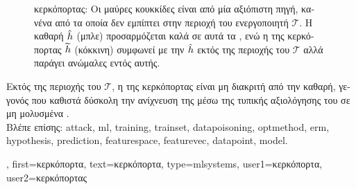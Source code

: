 {{\begin{figure}[H]
\begin{center}
 			\end{center}
		{
 		\caption{ \foreignlanguage{greek}{κερκόπορτας}: \foreignlanguage{greek}{Οι μαύρες κουκκίδες είναι} 
			 \foreignlanguage{greek}{από μία αξιόπιστη πηγή, κανένα από τα οποία δεν εμπίπτει στην
			περιοχή του ενεργοποιητή $\mathcal{T}$. Η καθαρή}  $\hat{h}$ (\foreignlanguage{greek}{μπλε) 
			προσαρμόζεται καλά σε αυτά τα} , \foreignlanguage{greek}{ενώ η}
 			 \foreignlanguage{greek}{της κερκόπορτας $\widetilde{h}$ (κόκκινη)
			συμφωνεί με την $\hat{h}$ εκτός της περιοχής του $\mathcal{T}$ αλλά παράγει ανώμαλες}  
			\foreignlanguage{greek}{εντός αυτής}. \label{fig_backdoor_dict}} }
 		\end{figure}
 		\foreignlanguage{greek}{Εκτός της περιοχής του $\mathcal{T}$, η}  \foreignlanguage{greek}{της κερκόπορτας είναι μη διακριτή 
		από την καθαρή, γεγονός που καθιστά δύσκολη την ανίχνευση της}  \foreignlanguage{greek}{μέσω της 
		τυπικής αξιολόγησης του}  \foreignlanguage{greek}{σε μη μολυσμένα} .
		\\
		\foreignlanguage{greek}{Βλέπε επίσης:} \gls{attack}, \gls{ml}, \gls{training}, \gls{trainset}, \gls{datapoisoning}, \gls{optmethod}, \gls{erm}, 
		\gls{hypothesis}, \gls{prediction}, \gls{featurespace}, \gls{featurevec}, \gls{datapoint}, \gls{model}.},
	first={\foreignlanguage{greek}{κερκόπορτα}},
	text={\foreignlanguage{greek}{κερκόπορτα}},
	type=mlsystems,
	user1={\foreignlanguage{greek}{κερκόπορτα}}, %
	user2={\foreignlanguage{greek}{κερκόπορτας}} %
}

